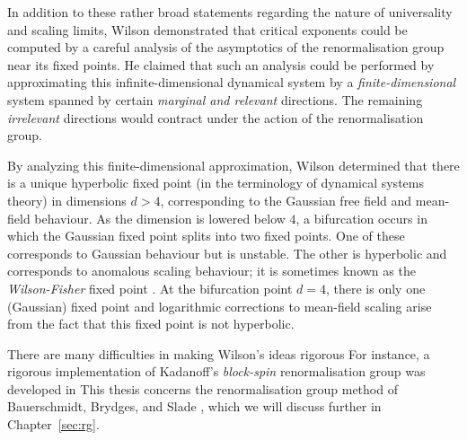 In addition to these rather broad statements regarding the nature of universality
and scaling limits, Wilson demonstrated that critical exponents could be computed
by a careful analysis of the asymptotics of the renormalisation group near its
fixed points. He claimed that such an analysis could be performed by approximating
this infinite-dimensional dynamical system by a \emph{finite-dimensional} system
spanned by certain \emph{marginal and relevant} directions. The remaining \emph{irrelevant}
directions would contract under the action of the renormalisation group.

By analyzing this finite-dimensional approximation, Wilson determined that there
is a unique hyperbolic fixed point (in the terminology of dynamical systems theory)
in dimensions $d > 4$, corresponding to the Gaussian
free field and mean-field behaviour. As the dimension is lowered below $4$, a
bifurcation occurs in which the Gaussian fixed point splits into two fixed points.
One of these corresponds to Gaussian behaviour but is unstable. The other is hyperbolic and
corresponds to anomalous scaling behaviour; it is sometimes known as the
\emph{Wilson-Fisher} fixed point \cite{WF72}. At the bifurcation point $d = 4$, there is only
one (Gaussian) fixed point and logarithmic corrections to mean-field scaling arise
from the fact that this fixed point is not hyperbolic.

There are many difficulties in making Wilson's ideas rigorous  %
For instance, a rigorous implementation of Kadanoff's \emph{block-spin}
renormalisation group was developed in \cite{GK85}
 This thesis concerns the renormalisation group method of Bauerschmidt,
Brydges, and Slade \cite{BS-rg-norm,BS-rg-loc,BBS-rg-pt,BS-rg-IE,BS-rg-step},
which we will discuss further in Chapter~\ref{sec:rg}.

